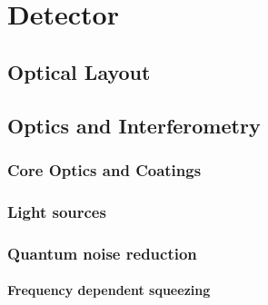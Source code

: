 \chapter{Detector}
\label{chap:Detector}

\section {Optical Layout}
\label{Sec:Layout}

\FloatBarrier
\section{Optics and Interferometry}
\label{Sec:Optics}

\subsection{Core Optics and Coatings}
\label{Sec:CoreOptics}


\subsection{Light sources}
\label{Sec:Lasers}



\label{Sec:Squeezers}

\subsection{Quantum noise reduction}


\label{Sec:QNR}

\subsubsection{Frequency dependent squeezing}

\label{Sec:FDS}


%

